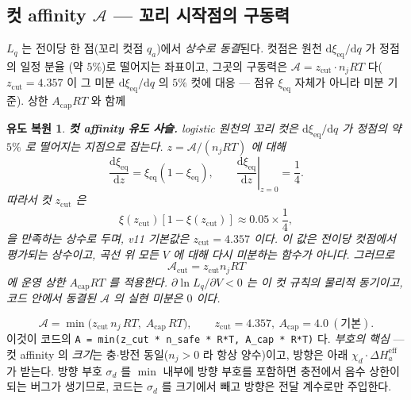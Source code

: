 \documentclass[11pt,a4paper]{article}
\newtheorem*{derivebox}{유도 복원}
\newcommand{\dd}{\mathrm{d}}
\newcommand{\eff}{\mathrm{eff}}
\newcommand{\eq}{\mathrm{eq}}
\newcommand{\code}[1]{\texttt{#1}}
\begin{document}
\subsection{컷 affinity $\mathcal A$ — 꼬리 시작점의 구동력}
$L_q$ 는 전이당 한 점(꼬리 컷점 $q_a$)에서 \emph{상수로 동결}된다. 컷점은 원천 $\dd\xi_\eq/\dd q$ 가 정점의 일정 분율
(약 $5\%$)로 떨어지는 좌표이고, 그곳의 구동력은 $\mathcal A=z_\mathrm{cut}\cdot n_jRT$ 다($z_\mathrm{cut}=4.357$ 이
그 미분 $\dd\xi_\eq/\dd q$ 의 $5\%$ 컷에 대응 — 점유 $\xi_\eq$ 자체가 아니라 미분 기준). 상한 $A_\mathrm{cap}RT$ 와 함께

\begin{derivebox}
\textbf{컷 affinity 유도 사슬.} logistic 원천의 꼬리 컷은 $\dd\xi_{\eq}/\dd q$ 가 정점의 약 $5\%$ 로 떨어지는 지점으로 잡는다. $z=\mathcal A/(n_jRT)$ 에 대해
\begin{equation*}
\frac{\dd\xi_{\eq}}{\dd z}=\xi_{\eq}(1-\xi_{\eq}),\qquad
\left.\frac{\dd\xi_{\eq}}{\dd z}\right|_{z=0}=\frac14.
\end{equation*}
따라서 컷 $z_{\mathrm{cut}}$ 은
\begin{equation*}
\xi(z_{\mathrm{cut}})[1-\xi(z_{\mathrm{cut}})]\approx0.05\times\frac14,
\end{equation*}
을 만족하는 상수로 두며, v11 기본값은 $z_{\mathrm{cut}}=4.357$ 이다. 이 값은 전이당 컷점에서 평가되는 상수이고, 곡선 위 모든 $V$ 에 대해 다시 미분하는 함수가 아니다. 그러므로
\begin{equation*}
\mathcal A_{\mathrm{cut}}=z_{\mathrm{cut}}n_jRT
\end{equation*}
에 운영 상한 $A_{\mathrm{cap}}RT$ 를 적용한다. $\partial\ln L_q/\partial V<0$ 는 이 컷 규칙의 물리적 동기이고, 코드 안에서 동결된 $\mathcal A$ 의 실현 미분은 $0$ 이다.
\end{derivebox}

\begin{equation}
\mathcal A=\min\!\big(z_\mathrm{cut}\,n_j\,RT,\;A_\mathrm{cap}\,RT\big),
\qquad z_\mathrm{cut}=4.357,\ A_\mathrm{cap}=4.0\ (\text{기본}).
\label{eq:Acut}
\end{equation}
이것이 코드의 \code{A = min(z\_cut * n\_safe * R*T, A\_cap * R*T)} 다. \emph{부호의 핵심} — 컷 affinity 의 \emph{크기}는
충$\cdot$방전 동일($n_j>0$ 라 항상 양수)이고, 방향은 아래 $\chi_d\cdot\Delta H_a^\eff$ 가 받는다. 방향 부호 $\sigma_d$ 를
$\min$ 내부에 방향 부호를 포함하면 충전에서 음수 상한이 되는 버그가 생기므로, 코드는 $\sigma_d$ 를 크기에서 빼고 방향은 전달 계수로만
주입한다.
\end{document}
